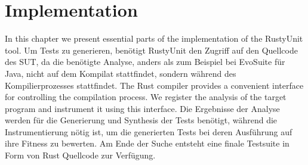 \documentclass{article}
\begin{document}


\newpage
\section{Implementation}
In this chapter we present essential parts of the implementation of the RustyUnit tool. Um Tests zu generieren, benötigt RustyUnit den Zugriff auf den Quellcode des SUT, da die benötigte Analyse, anders als zum Beispiel bei EvoSuite für Java, nicht auf dem Kompilat stattfindet, sondern während des Kompilierprozesses stattfindet. The Rust compiler provides a convenient interface for controlling the compilation process. We register the analysis of the target program and instrument it using this interface. Die Ergebnisse der Analyse werden für die Generierung und Synthesis der Tests benötigt, während die Instrumentierung nötig ist, um die generierten Tests bei deren Ausführung auf ihre Fitness zu bewerten. Am Ende der Suche entsteht eine finale Testsuite in Form von Rust Quellcode zur Verfügung.
\end{document}
